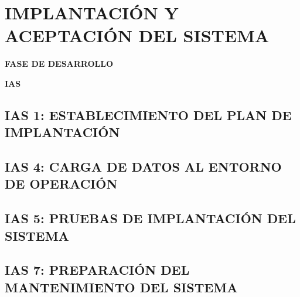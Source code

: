 \newpage
\chapter{IMPLANTACIÓN Y ACEPTACIÓN DEL SISTEMA}
	\vspace{2cm}	
	\begin{center}
	{\Large \textbf{FASE DE DESARROLLO} \par}
	\end{center}
	\vspace{5cm}
	
	\begin{center}
	\Huge \textbf{IAS}\par
	\end{center}

\newpage

\section{IAS 1: ESTABLECIMIENTO DEL PLAN DE IMPLANTACIÓN}


\newpage
\section{IAS 4: CARGA DE DATOS AL ENTORNO DE OPERACIÓN}


\newpage
\section{IAS 5: PRUEBAS DE IMPLANTACIÓN DEL SISTEMA}


\newpage
\section{IAS 7: PREPARACIÓN DEL MANTENIMIENTO DEL SISTEMA}


%
%
%
